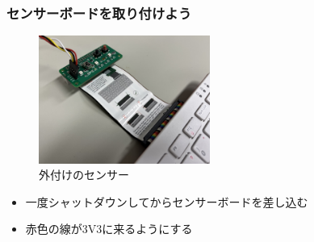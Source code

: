\begin{frame}
  \frametitle{センサーボードを取り付けよう}
  \begin{figure}
    \centering

    \includegraphics[width=0.5\textwidth]{../images/chap03/how_to_install_bme280.jpg}
    \caption{外付けのセンサー}
  \end{figure}
  \begin{itemize}
    \item 一度シャットダウンしてからセンサーボードを差し込む
    \item 赤色の線が3V3に来るようにする
  \end{itemize}
\end{frame}



